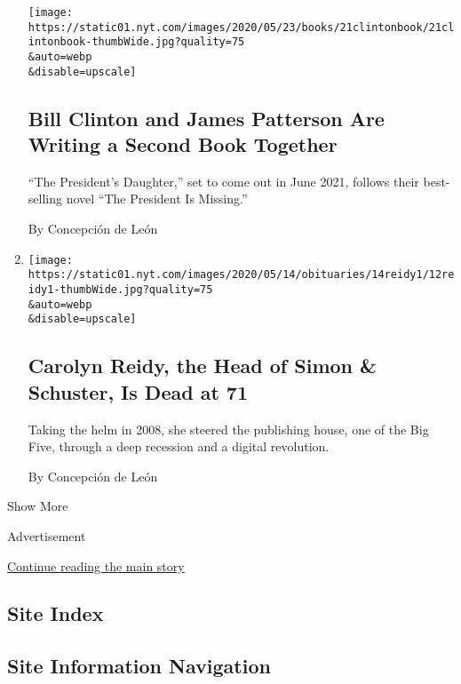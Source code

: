 \begin{enumerate}
  \texttt{[image: https://static01.nyt.com/images/2020/05/23/books/21clintonbook/21clintonbook-thumbWide.jpg?quality=75\\\&auto=webp\\\&disable=upscale]}

  \hypertarget{bill-clinton-and-james-patterson-are-writing-a-second-book-together}{%
  \subsection{Bill Clinton and James Patterson Are Writing a Second Book
  Together}\label{bill-clinton-and-james-patterson-are-writing-a-second-book-together}}

  ``The President's Daughter,'' set to come out in June 2021, follows
  their best-selling novel ``The President Is Missing.''

  By Concepción de León
\item
  \href{/2020/05/12/books/carolyn-reidy-dead.html}{}

  \texttt{[image: https://static01.nyt.com/images/2020/05/14/obituaries/14reidy1/12reidy1-thumbWide.jpg?quality=75\\\&auto=webp\\\&disable=upscale]}

  \hypertarget{carolyn-reidy-the-head-of-simon--schuster-is-dead-at-71}{%
  \subsection{Carolyn Reidy, the Head of Simon \& Schuster, Is Dead at
  71}\label{carolyn-reidy-the-head-of-simon--schuster-is-dead-at-71}}

  Taking the helm in 2008, she steered the publishing house, one of the
  Big Five, through a deep recession and a digital revolution.

  By Concepción de León
\end{enumerate}

Show More

Advertisement

\protect\hyperlink{after-mid2}{Continue reading the main story}

\hypertarget{site-index}{%
\subsection{Site Index}\label{site-index}}

\hypertarget{site-information-navigation}{%
\subsection{Site Information
Navigation}\label{site-information-navigation}}

